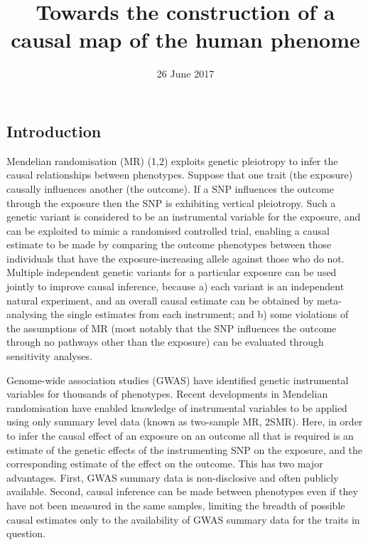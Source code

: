 \documentclass[]{article}
\title{Towards the construction of a causal map of the human phenome}
\author{}
\date{26 June 2017}
\begin{document}
\maketitle

\subsection{Introduction}\label{introduction}

Mendelian randomisation (MR) (1,2) exploits genetic pleiotropy to infer
the causal relationships between phenotypes. Suppose that one trait (the
exposure) causally influences another (the outcome). If a SNP influences
the outcome through the exposure then the SNP is exhibiting vertical
pleiotropy. Such a genetic variant is considered to be an instrumental
variable for the exposure, and can be exploited to mimic a randomised
controlled trial, enabling a causal estimate to be made by comparing the
outcome phenotypes between those individuals that have the
exposure-increasing allele against those who do not. Multiple
independent genetic variants for a particular exposure can be used
jointly to improve causal inference, because a) each variant is an
independent natural experiment, and an overall causal estimate can be
obtained by meta-analysing the single estimates from each instrument;
and b) some violations of the assumptions of MR (most notably that the
SNP influences the outcome through no pathways other than the exposure)
can be evaluated through sensitivity analyses.

Genome-wide association studies (GWAS) have identified genetic
instrumental variables for thousands of phenotypes. Recent developments
in Mendelian randomisation have enabled knowledge of instrumental
variables to be applied using only summary level data (known as
two-sample MR, 2SMR). Here, in order to infer the causal effect of an
exposure on an outcome all that is required is an estimate of the
genetic effects of the instrumenting SNP on the exposure, and the
corresponding estimate of the effect on the outcome. This has two major
advantages. First, GWAS summary data is non-disclosive and often
publicly available. Second, causal inference can be made between
phenotypes even if they have not been measured in the same samples,
limiting the breadth of possible causal estimates only to the
availability of GWAS summary data for the traits in question.
\end{document}
